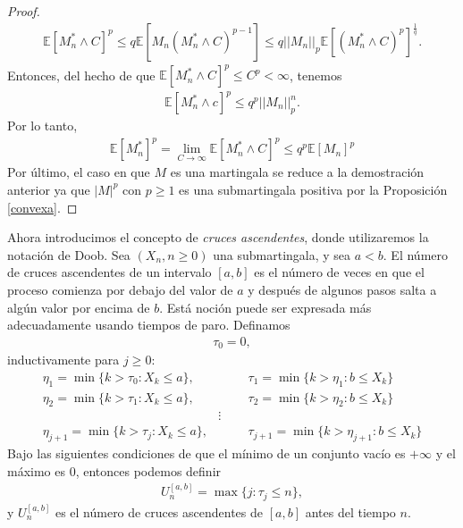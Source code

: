 \begin{proof}
\begin{align*}
		\mathbb{E}[M_n^{*} \wedge C]^p \leq q\mathbb{E}[M_n (M_n^{*} \wedge C)^{p-1}] \leq q ||M_n||_p \mathbb{E}[(M_n^{*} \wedge C)^p]^{\frac{1}{q}}.
	\end{align*}
Entonces, del hecho de que $\mathbb{E}[M_n^{*} \wedge C]^p \leq C^p < \infty$, tenemos
	\begin{align*}
		\mathbb{E}[M_n^{*} \wedge c]^p \leq q^p ||M_n||_p^n.
	\end{align*}
Por lo tanto, 
	\begin{align*}
		\mathbb{E}[M_n^{*}]^p = \lim_{C \rightarrow \infty} \mathbb{E}[M_n^{*} \wedge C]^p \leq q^p\mathbb{E}[M_n]^p
	\end{align*}
Por último, el caso en que $M$ es una martingala se reduce a la demostración anterior ya que $|M|^p$ con $p \geq 1$ es una submartingala positiva por la Proposición \ref{convexa}.
\end{proof}

Ahora introducimos el concepto de \emph{cruces ascendentes}, donde utilizaremos la notación de Doob. Sea $(X_n, n \geq 0)$ una submartingala, y sea $a < b$. El número de cruces ascendentes de un intervalo $[a, b]$ es el número de veces en que el proceso comienza por debajo del valor de $a$ y después de algunos pasos salta a algún valor por encima de $b$. Está noción puede ser expresada más adecuadamente usando tiempos de paro. Definamos
\begin{align*}
	\tau_0 = 0,
\end{align*}
inductivamente para $j \geq 0$:
	\begin{align*}
		\eta_{1} = \min \{k > \tau_0 : X_k \leq a \}, & \hspace{1cm} \tau_{1} = \min \{k > \eta_{1} : b \leq X_k \} \\
		\eta_{2} = \min \{k > \tau_1 : X_k \leq a \}, & \hspace{1cm} \tau_{2} = \min \{k > \eta_{2} : b \leq X_k \} \\
		& \vdots \\
		\eta_{j+1} = \min \{k > \tau_j : X_k \leq a \}, & \hspace{1cm} \tau_{j+1} = \min \{k > \eta_{j+1} : b \leq X_k \}
	\end{align*}
Bajo las siguientes condiciones de que el mínimo de un conjunto vacío es $+ \infty$ y el máximo es $0$, entonces podemos definir
	\begin{align}
		U_n^{[a, b]} = \max \{j : \tau_j \leq n\}, \label{aan}
	\end{align}
y $U_n^{[a, b]}$ es el número de cruces ascendentes de $[a, b]$ antes del tiempo $n$.


